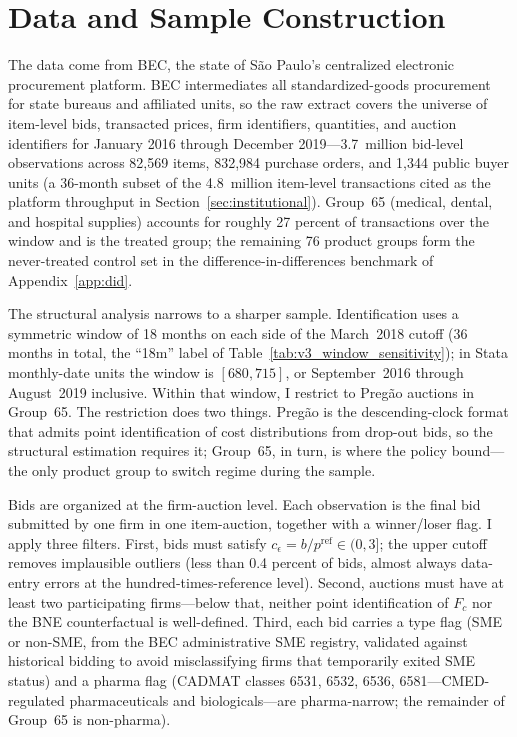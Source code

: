 \section{Data and Sample Construction}\label{sec:data}

The data come from BEC, the state of S\~ao Paulo's centralized electronic procurement platform. BEC intermediates all standardized-goods procurement for state bureaus and affiliated units, so the raw extract covers the universe of item-level bids, transacted prices, firm identifiers, quantities, and auction identifiers for January 2016 through December 2019---3.7~million bid-level observations across 82{,}569 items, 832{,}984 purchase orders, and 1{,}344 public buyer units (a 36-month subset of the 4.8~million item-level transactions cited as the platform throughput in Section~\ref{sec:institutional}). Group~65 (medical, dental, and hospital supplies) accounts for roughly 27 percent of transactions over the window and is the treated group; the remaining 76 product groups form the never-treated control set in the difference-in-differences benchmark of Appendix~\ref{app:did}.

The structural analysis narrows to a sharper sample. Identification uses a symmetric window of 18 months on each side of the March~2018 cutoff (36 months in total, the ``18m'' label of Table~\ref{tab:v3_window_sensitivity}); in Stata monthly-date units the window is $[680, 715]$, or September~2016 through August~2019 inclusive. Within that window, I restrict to Preg\~ao auctions in Group~65. The restriction does two things. Preg\~ao is the descending-clock format that admits point identification of cost distributions from drop-out bids, so the structural estimation requires it; Group~65, in turn, is where the policy bound---the only product group to switch regime during the sample.

Bids are organized at the firm-auction level. Each observation is the final bid submitted by one firm in one item-auction, together with a winner/loser flag. I apply three filters. First, bids must satisfy $c_\epsilon = b / p^{\mathrm{ref}} \in (0, 3]$; the upper cutoff removes implausible outliers (less than 0.4 percent of bids, almost always data-entry errors at the hundred-times-reference level). Second, auctions must have at least two participating firms---below that, neither point identification of $F_c$ nor the BNE counterfactual is well-defined. Third, each bid carries a type flag (SME or non-SME, from the BEC administrative SME registry, validated against historical bidding to avoid misclassifying firms that temporarily exited SME status) and a pharma flag (CADMAT classes 6531, 6532, 6536, 6581---CMED-regulated pharmaceuticals and biologicals---are pharma-narrow; the remainder of Group~65 is non-pharma).

